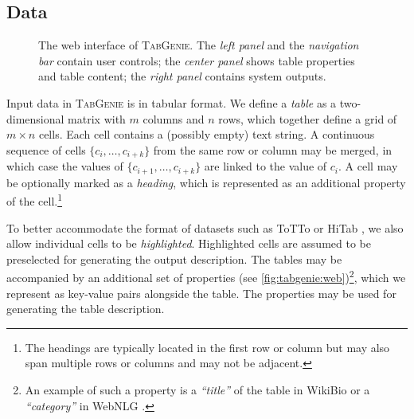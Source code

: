 \subsection{Data}
\label{sec:tabgenie:data}

\begin{figure}[t]
    \centering
    \setlength{\fboxsep}{0pt}
    \caption[The web interface of \textsc{TabGenie}.]{The web interface of \textsc{TabGenie}. The \emph{left panel} and the \emph{navigation bar} contain user controls; the \emph{center panel} shows table properties and table content; the \emph{right panel} contains system outputs.}
    \label{fig:tabgenie:web}
\end{figure}
Input data in \textsc{TabGenie} is in tabular format. We define a \textit{table} as a two-dimensional matrix with $m$ columns and $n$ rows, which together define a grid of $m \times n$ cells. Each cell contains a (possibly empty) text string. A continuous sequence of cells $\{c_{i}, \ldots, c_{i+k}\}$ from the same row or column may be merged, in which case the values of $\{c_{i+1},\ldots,c_{i+k}\}$ are linked to the value of $c_{i}$.  A cell may be optionally marked as a \textit{heading}, which is represented as an additional property of the cell.\footnote{The headings are typically located in the first row or column but may also span multiple rows or columns and may not be adjacent.}

To better accommodate the format of datasets such as ToTTo \cite{parikhToTToControlledTableToText2020} or HiTab \cite{chengHiTabHierarchicalTable2021}, we also allow individual cells to be \textit{highlighted}. Highlighted cells are assumed to be preselected for generating the output description. The tables may be accompanied by an additional set of properties (see \autoref{fig:tabgenie:web})\footnote{An example of such a property is a \textit{``title''} of the table in WikiBio \cite{lebretNeuralTextGeneration2016} or a \textit{``category''} in WebNLG \cite{gardentWebNLGChallengeGenerating2017}.}, which we represent as key-value pairs alongside the table. The properties may be used for generating the table description.

